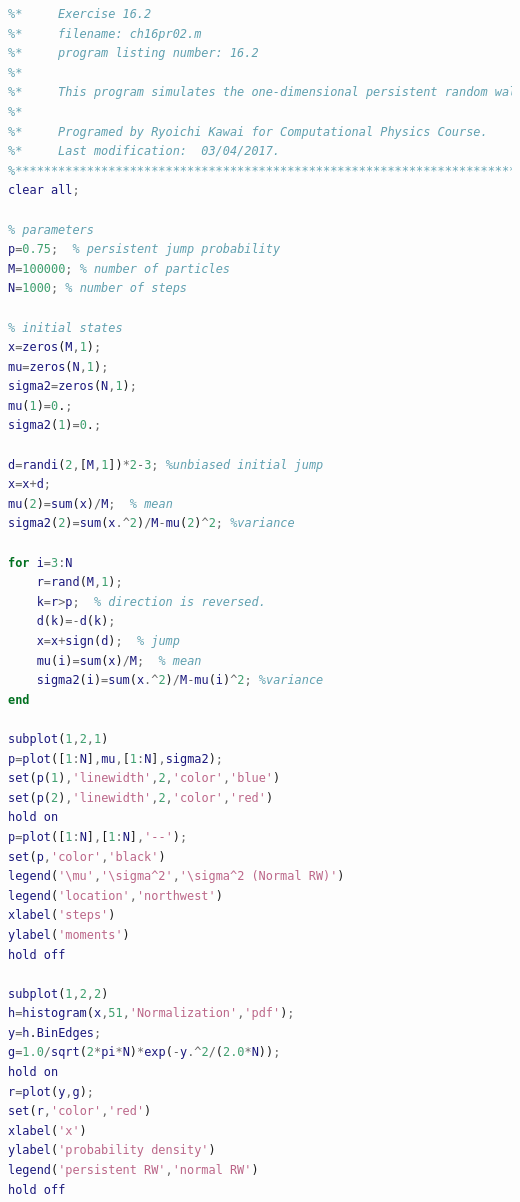 \noindent
\program
\label{prog:rw_1d_persistent}
\footnotesize
\begin{lstlisting}[language=matlab]
%**************************************************************************
%*     Exercise 16.2                                                      *
%*     filename: ch16pr02.m                                               *
%*     program listing number: 16.2                                       *
%*                                                                        *
%*     This program simulates the one-dimensional persistent random walk. *
%*                                                                        *
%*     Programed by Ryoichi Kawai for Computational Physics Course.       *
%*     Last modification:  03/04/2017.                                    *
%**************************************************************************
clear all;

% parameters
p=0.75;  % persistent jump probability
M=100000; % number of particles
N=1000; % number of steps

% initial states
x=zeros(M,1);
mu=zeros(N,1);
sigma2=zeros(N,1);
mu(1)=0.;
sigma2(1)=0.;

d=randi(2,[M,1])*2-3; %unbiased initial jump
x=x+d;
mu(2)=sum(x)/M;  % mean
sigma2(2)=sum(x.^2)/M-mu(2)^2; %variance

for i=3:N
    r=rand(M,1);
    k=r>p;  % direction is reversed.
    d(k)=-d(k);
    x=x+sign(d);  % jump
    mu(i)=sum(x)/M;  % mean
    sigma2(i)=sum(x.^2)/M-mu(i)^2; %variance
end

subplot(1,2,1)
p=plot([1:N],mu,[1:N],sigma2);
set(p(1),'linewidth',2,'color','blue')
set(p(2),'linewidth',2,'color','red')
hold on
p=plot([1:N],[1:N],'--');
set(p,'color','black')
legend('\mu','\sigma^2','\sigma^2 (Normal RW)')
legend('location','northwest')
xlabel('steps')
ylabel('moments')
hold off

subplot(1,2,2)
h=histogram(x,51,'Normalization','pdf');
y=h.BinEdges;
g=1.0/sqrt(2*pi*N)*exp(-y.^2/(2.0*N));
hold on
r=plot(y,g);
set(r,'color','red')
xlabel('x')
ylabel('probability density')
legend('persistent RW','normal RW')
hold off
\end{lstlisting}
\normalsize

